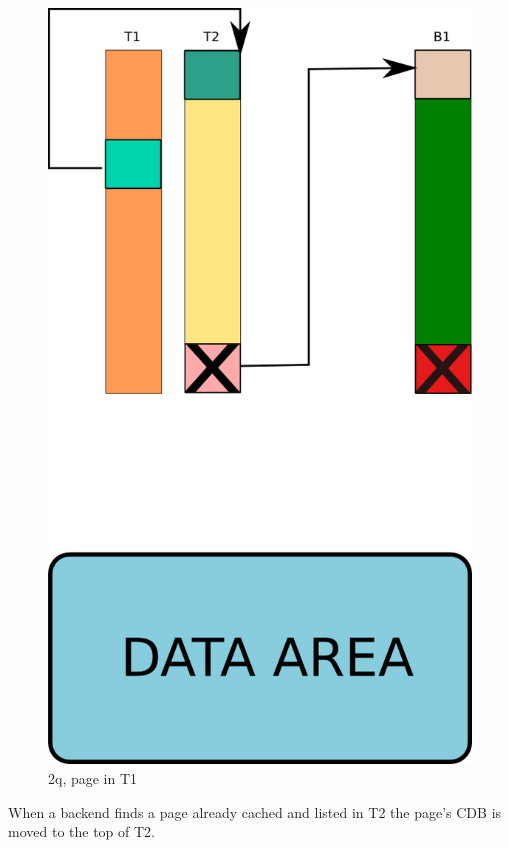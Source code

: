 \begin{figure}[H]
\includegraphics[scale=0.4]{images/2q_02.png}

\caption{2q, page in T1}

\end{figure}

When a backend finds a page already cached and listed in T2 the page's CDB is moved to the top of T2.\newline

